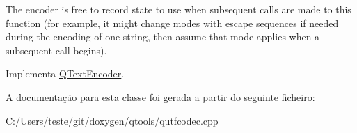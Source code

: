 The encoder is free to record state to use when subsequent calls are made to this function (for example, it might change modes with escape sequences if needed during the encoding of one string, then assume that mode applies when a subsequent call begins). 

Implementa \hyperlink{class_q_text_encoder_aacab43367cc5203dd9ec329729914442}{Q\-Text\-Encoder}.



A documentação para esta classe foi gerada a partir do seguinte ficheiro\-:\begin{DoxyCompactItemize}
\item 
C\-:/\-Users/teste/git/doxygen/qtools/qutfcodec.\-cpp\end{DoxyCompactItemize}
